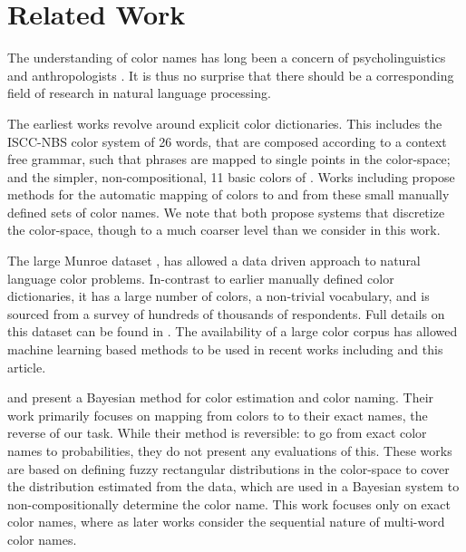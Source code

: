 \section{Related Work}\label{sec:related-work}
The understanding of color names has long been a concern of psycholinguistics and anthropologists \parencite{berlin1969basic,heider1972universals,HEIDER1972337,mylonas2015use}.
It is thus no surprise that there should be a corresponding field of research in natural language processing.

The earliest works revolve around explicit color dictionaries.
This includes the ISCC-NBS color system \parencite{kelly1955iscc} of 26 words, that are composed according to a context free grammar, such that phrases are mapped to single points in the color-space;
and the simpler, non-compositional, 11 basic colors of \textcite{berlin1969basic}.
Works including \textcite{Berk:1982:HFS:358589.358606,conway1992experimental,ele1994computational, mojsilovic2005computational, menegaz2007discrete,van2009learning}  propose methods for the automatic mapping of colors to and from these small manually defined sets of color names.
We note that \textcite{menegaz2007discrete,van2009learning} both propose systems that discretize the color-space, though to a much coarser level than we consider in this work.

The large Munroe dataset \parencite{Munroe2010XKCDdataset},
has allowed a data driven approach to natural language color problems.
In-contrast to earlier manually defined color dictionaries,
it has a large number of colors,  a non-trivial vocabulary,
and is sourced from a survey of hundreds of thousands of respondents.
Full details on this dataset can be found in .
The availability of a large color corpus has allowed machine learning based methods to be used in recent works including 
\textcite{mcmahan2015bayesian,meomcmahanstone:color,2016arXiv160603821M,acl2018WinnLighter} and this article.


\textcite{mcmahan2015bayesian} and \textcite{meomcmahanstone:color} present a Bayesian method for color estimation and color naming.
Their work primarily focuses on mapping from colors to to their exact names, the reverse of our task.
While their method is reversible: to go from exact color names to probabilities, they do not present any evaluations of this.
These works are based on defining fuzzy rectangular distributions in the color-space to cover the distribution estimated from the data, which are used in a Bayesian system to non-compositionally determine the color name.
This work focuses only on exact color names, where as later works consider the sequential nature of multi-word color names.


